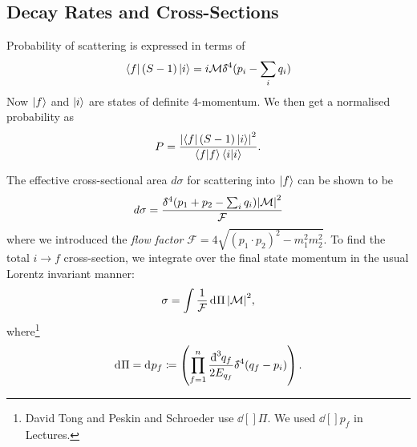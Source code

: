 \subsection*{Decay Rates and Cross-Sections}%

Probability of scattering is expressed in terms of 
\begin{equation}
  \bra{f} (S-1) \ket{i} = i \mathcal{M} \bdelta^4 (p_i - \sum_i q_i)
\end{equation}
Now $\ket{f}$ and $\ket{i}$ are states of definite $4$-momentum.
We then get a normalised probability as
\begin{equation}
  P = \frac{\abs{\bra{f}(S-1)\ket{i}}^2}{\bra{f}\ket{f}\bra{i}\ket{i}}.
\end{equation}

The effective cross-sectional area $d\sigma$ for scattering into $\ket{f}$ can be shown \cite{peskin95} to be
\begin{equation}
  d\sigma = \frac{\bdelta^4 (p_1 + p_2 - \sum_i q_i) \abs{\mathcal{M}}^2}{\mathcal{F}}
\end{equation}
where we introduced the \emph{flow factor} $ \mathcal{F} = 4 \sqrt{(p_1 \cdot p_2)^2 - m_1^2 m_2^2}$.
To find the total $i \to f$ cross-section, we integrate over the final state momentum in the usual Lorentz invariant manner:
\begin{equation}
  \sigma = \int \frac{1}{\mathcal{F}} \dd[]{\Pi} \abs{\mathcal{M}}^2,
\end{equation}
where\footnote{David Tong and Peskin and Schroeder use $\dd[]{\Pi}$. We used $\dd[]{p_f}$ in Lectures.}
\begin{equation}
  \dd[]{\Pi} = \dd[]{p_f} \coloneqq \left( \prod_{f=1}^n \frac{\bdd[3]{q_f}}{2E_{q_f}} \bdelta^4( q_f - p_i) \right).
\end{equation}
